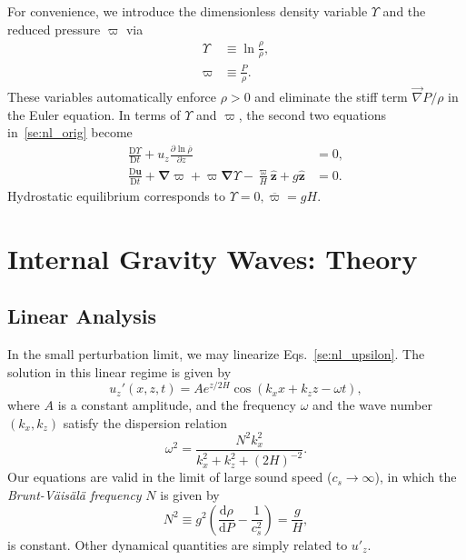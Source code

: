 \documentclass[
        fleqn,
        usenatbib,
        referee,
    ]{mnras}
\newcommand*{\rd}[2]{\frac{\mathrm{d}#1}{\mathrm{d}#2}}
\newcommand*{\pd}[2]{\frac{\partial#1}{\partial#2}}
\newcommand*{\md}[2]{\frac{\mathrm{D}#1}{\mathrm{D}#2}}
\newcommand*{\p}[1]{\left(#1\right)}
\newcommand*{\bm}[1]{\mathbf{#1}}
\newcommand*{\uv}[1]{\hat{\mathbf{#1}}}
\begin{document}
For convenience, we introduce the dimensionless density variable $\Upsilon$ and
the reduced pressure $\varpi$ \citep[e.g.][]{lecoanet_anel} via
\begin{align}
    \Upsilon &\equiv \ln \frac{\rho}{\bar{\rho}},\\
    \varpi &\equiv \frac{P}{\rho}.
\end{align}
These variables automatically enforce $\rho > 0$ and eliminate the stiff term
$\vec{\nabla} P / \rho$ in the Euler equation. In terms of $\Upsilon$ and
$\varpi$, the second two equations in~\eqref{se:nl_orig} become
\begin{subequations}\label{se:nl_upsilon}
    \begin{align}
        \md{\Upsilon}{t} + u_z \pd{\ln \overline{\rho}}{z} &= 0
            ,\label{eq:nl_up_density} \\
        \md{\bm{u}}{t} + \bm{\nabla}\varpi + \varpi\bm{\nabla}\Upsilon
            - \frac{\varpi}{H}\uv{z} + g\uv{z} &= 0\label{eq:nl_upsilon_u}.
    \end{align}
\end{subequations}
Hydrostatic equilibrium corresponds to $\Upsilon = 0, \overline{\varpi} = gH$.

\section{Internal Gravity Waves: Theory}\label{s:theory}

\subsection{Linear Analysis}\label{ss:lin_analysis}

In the small perturbation limit, we may linearize
Eqs.~\eqref{se:nl_upsilon}. The solution in this linear regime is given by
\citep{drazin,sutherland0}
\begin{equation}
    u_z'\p{x, z, t} = Ae^{z/2H}\cos\p{k_{x}x + k_{z}z - \omega t},
        \label{eq:lin_sol}
\end{equation}
where $A$ is a constant amplitude, and the frequency $\omega$ and the wave
number $\p{k_x, k_z}$ satisfy the dispersion relation
\begin{equation}
    \omega^2 = \frac{N^2k_{x}^2}{k_{x}^2 + k_{z}^2 + \p{2H}^{-2}}.
        \label{eq:disp_rel}
\end{equation}
Our equations are valid in the limit of large sound speed ($c_s \to \infty$), in
which the \emph{Brunt-V\"ais\"al\"a frequency} $N$ is given by
\begin{equation}
    N^2 \equiv g^2\p{\rd{\rho}{P} - \frac{1}{c_s^2}} = \frac{g}{H},
\end{equation}
is constant. Other dynamical quantities are simply related to $u'_z$.
\end{document}
